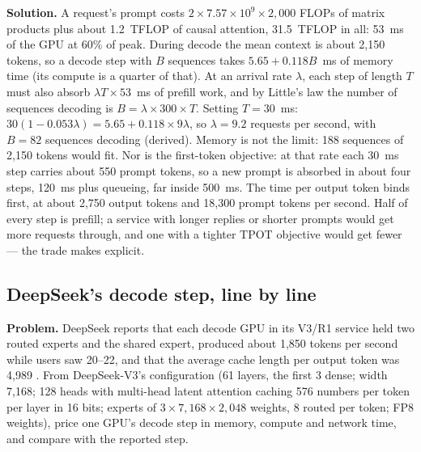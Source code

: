 \textbf{Solution.} A request's prompt costs $2 \times 7.57 \times 10^{9} \times
2{,}000$ FLOPs of matrix products plus about 1.2~TFLOP of causal attention,
31.5~TFLOP in all: 53~ms of the GPU at 60\% of peak. During decode the mean context
is about 2,150 tokens, so a decode step with $B$ sequences takes
$5.65 + 0.118B$~ms of memory time (its compute is a quarter of that). At an
arrival rate $\lambda$, each step of length $T$ must also absorb
$\lambda T \times 53$~ms of prefill work, and by Little's law the number of
sequences decoding is $B = \lambda \times 300 \times T$. Setting $T = 30$~ms:
$30(1 - 0.053\lambda) = 5.65 + 0.118 \times 9\lambda$, so $\lambda = 9.2$ requests
per second, with $B = 82$ sequences decoding (derived). Memory is not the limit:
188 sequences of 2,150 tokens would fit. Nor is the first-token objective: at
that rate each 30~ms step carries about 550 prompt tokens, so a new prompt is
absorbed in about four steps, 120~ms plus queueing, far inside 500~ms. The time
per output token binds first, at about 2,750 output tokens and 18,300 prompt tokens
per second. Half of every step is prefill; a service with longer replies or
shorter prompts would get more requests through, and one with a tighter TPOT
objective would get fewer --- the trade  makes explicit.

\subsection{DeepSeek's decode step, line by line}
\textbf{Problem.} DeepSeek reports that each decode GPU in its V3/R1 service
held two routed experts and the shared expert, produced about 1,850 tokens per
second while users saw 20--22, and that the average cache length per output
token was 4,989 \cite{deepseek2025inference}. From DeepSeek-V3's configuration
(61 layers, the first 3 dense; width 7,168; 128 heads with multi-head latent
attention caching 576 numbers per token per layer in 16 bits; experts of
$3 \times 7{,}168 \times 2{,}048$ weights, 8 routed per token; FP8 weights), price one
GPU's decode step in memory, compute and network time, and compare with the
reported step.

